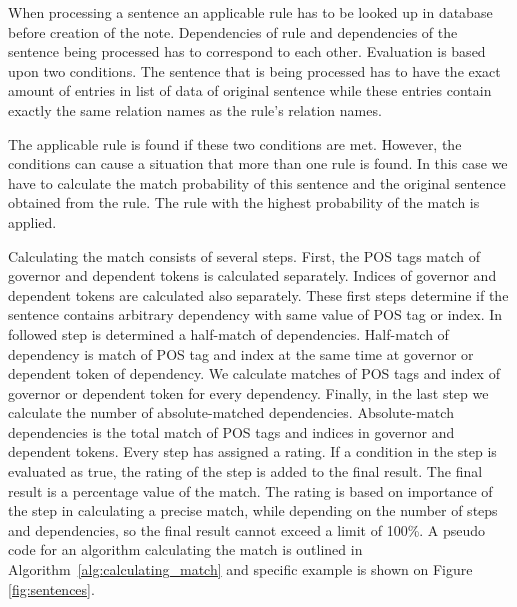\documentclass{iitsrc}
\begin{document}
		When processing a sentence an applicable rule has to be looked up in database before creation of the note. Dependencies of rule and dependencies of the sentence being processed has to correspond to each other. Evaluation is based upon two conditions. The sentence that is being processed has to have the exact amount of entries in list of data of original sentence while these entries contain exactly the same relation names as the rule's relation names.
			
		The applicable rule is found if these two conditions are met. However, the conditions can cause a situation that more than one rule is found. In this case we have to calculate the match probability of this sentence and the original sentence obtained from the rule. The rule with the highest probability of the match is applied.
			
		Calculating the match consists of several steps. First, the POS tags match of governor and dependent tokens is calculated separately. Indices of governor and dependent tokens are calculated also separately. These first steps determine if the sentence contains arbitrary dependency with same value of POS tag or index. In followed step is determined a half-match of dependencies. Half-match of dependency is match of POS tag and index at the same time at governor or dependent token of dependency. We calculate matches of POS tags and index of governor or dependent token for every dependency. Finally, in the last step we calculate the number of absolute-matched dependencies. Absolute-match dependencies is the total match of POS tags and indices in governor and dependent tokens. Every step has assigned a rating. If a condition in the step is evaluated as true, the rating of the step is added to the final result. The final result is a percentage value of the match. The rating is based on importance of the step in calculating a precise match, while depending on the number of steps and dependencies, so the final result cannot exceed a limit of 100\%. A pseudo code for an algorithm calculating the match is outlined in Algorithm~\ref{alg:calculating_match} and specific example is shown on Figure \ref{fig:sentences}.  \\
			
\end{document}
